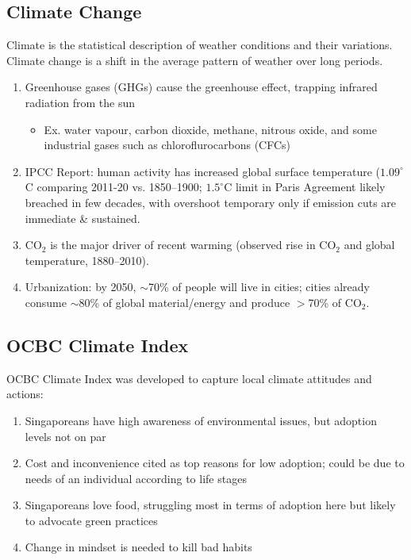 \documentclass[12pt, a4paper]{article}
\begin{document}
\begin{multicols*}{3}
\section{Climate Change}
Climate is the statistical description of weather conditions and their variations. Climate change is a shift in the average pattern of weather over long periods. 
\begin{enumerate}[\roman*.]
  \item Greenhouse gases (GHGs) cause the greenhouse effect, trapping infrared radiation from the sun 
    \begin{itemize}[leftmargin=*]\vspace{3pt}
      \item Ex. water vapour, carbon dioxide, methane, nitrous oxide, and some industrial gases such as chloroflurocarbons (CFCs)
    \end{itemize}
  \item IPCC Report: human activity has increased global surface temperature ($1.09^{\circ}$C comparing 2011-20 vs. 1850–1900; $1.5^{\circ}$C limit in Paris Agreement likely breached in few decades, with overshoot temporary only if emission cuts are immediate \& sustained.
  \item CO$_2$ is the major driver of recent warming (observed rise in CO$_2$ and global temperature, 1880–2010).
  \item Urbanization: by 2050, $\sim$70\% of people will live in cities; cities already consume $\sim$80\% of global material/energy and produce $>$70\% of CO$_2$. 
\end{enumerate}

\subsection{OCBC Climate Index}

OCBC Climate Index was developed to capture local climate attitudes and actions:
\begin{enumerate}[\roman*.]
  \item Singaporeans have high awareness of environmental issues, but adoption levels not on par 
  \item Cost and inconvenience cited as top reasons for low adoption; could be due to needs of an individual according to life stages 
  \item Singaporeans love food, struggling most in terms of adoption here but likely to advocate green practices 
  \item Change in mindset is needed to kill bad habits
\end{enumerate}


\end{multicols*}
\end{document}
